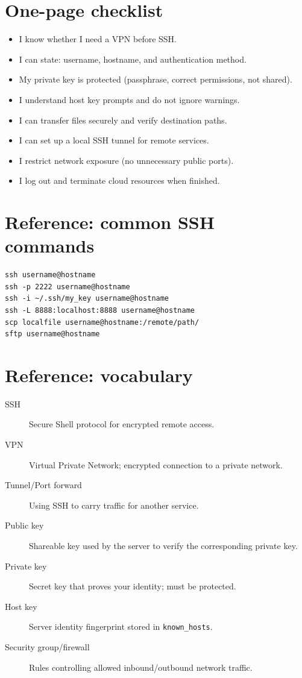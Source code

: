 \section{One-page checklist}
\begin{itemize}
\item I know whether I need a VPN before SSH.
\item I can state: username, hostname, and authentication method.
\item My private key is protected (passphrase, correct permissions, not shared).
\item I understand host key prompts and do not ignore warnings.
\item I can transfer files securely and verify destination paths.
\item I can set up a local SSH tunnel for remote services.
\item I restrict network exposure (no unnecessary public ports).
\item I log out and terminate cloud resources when finished.
\end{itemize}

\section{Reference: common SSH commands}
\begin{verbatim}
ssh username@hostname
ssh -p 2222 username@hostname
ssh -i ~/.ssh/my_key username@hostname
ssh -L 8888:localhost:8888 username@hostname
scp localfile username@hostname:/remote/path/
sftp username@hostname
\end{verbatim}

\section{Reference: vocabulary}
\begin{description}
\item[SSH] Secure Shell protocol for encrypted remote access.
\item[VPN] Virtual Private Network; encrypted connection to a private network.
\item[Tunnel/Port forward] Using SSH to carry traffic for another service.
\item[Public key] Shareable key used by the server to verify the corresponding private key.
\item[Private key] Secret key that proves your identity; must be protected.
\item[Host key] Server identity fingerprint stored in \texttt{known_hosts}.
\item[Security group/firewall] Rules controlling allowed inbound/outbound network traffic.
\end{description}
